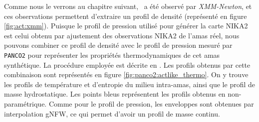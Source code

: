 Comme nous le verrons au chapitre suivant, \act\ a été observé par \textit{XMM-Newton}, et ces observations permettent d'extraire un profil de densité (représenté en figure \ref{fig:act:xmm}).
Puisque le profil de pression utilisé pour générer la carte NIKA2 est celui obtenu par ajustement des observations NIKA2 de l'amas réel, nous pouvons combiner ce profil de densité avec le profil de pression mesuré par \texttt{PANCO2} pour représenter les propriétés thermodynamiques de cet amas synthétique.
La procédure employée est décrite en .
Les profils obtenus par cette combinaison sont représentés en figure \ref{fig:panco2:actlike_thermo}.
On y trouve les profils de température et d'entropie du milieu intra-amas, ainsi que le profil de masse hydrostatique.
Les points bleus représentent les profils obtenus en non-paramétrique.
Comme pour le profil de pression, les enveloppes sont obtenues par interpolation gNFW, ce qui permet d'avoir un profil de masse continu.

